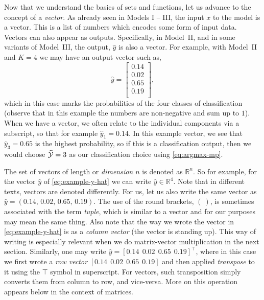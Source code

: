 Now that we understand the basics of sets and functions, let us advance to the concept of a {\em vector}. As already seen in Models I -- III, the input $x$ to the model is a vector. This is a list of numbers which encodes some form of input data. Vectors can also appear as outputs. Specifically, in Model~II, and in some variants of Model~III, the output, $\hat{y}$ is also a vector. For example, with Model~II and $K=4$ we may have an output vector such as,
%
\begin{equation}
\label{eq:example-y-hat}
\hat{y} =
\begin{bmatrix}
0.14 \\
0.02\\
0.65 \\
0.19\\
\end{bmatrix},
\end{equation}
%
which in this case marks the probabilities of the four classes of classification (observe that in this example the numbers are non-negative and sum up to $1$). When we have a vector, we often relate to the individual components via a subscript, so that for example $\hat{y}_1 = 0.14$. In this example vector, we see that $\hat{y}_3 = 0.65$ is the highest probability, so if this is a classification output, then we would choose $\widehat{\cal Y} = 3$ as our classification choice using \eqref{eq:argmax-mp}.

The set of vectors of length or {\em dimension $n$} is denoted as ${\mathbb R}^n$. So for example, for the vector $\hat{y}$ of \eqref{eq:example-y-hat} we can write $\hat{y} \in {\mathbb R}^4$. Note that in different texts, vectors are denoted differently. For us, let us also write the same vector as $\hat{y} = (0.14,\, 0.02,\, 0.65,\, 0.19)$. The use of the round brackets, $(~)$, is sometimes associated with the term {\em tuple}, which is similar to a vector and for our purposes may mean the same thing. Also note that the way we wrote the vector in \eqref{eq:example-y-hat} is as a {\em column vector} (the vector is standing up). This way of writing is especially relevant when we do matrix-vector multiplication in the next section. Similarly, one may write $\hat{y} = [ 0.14~~ 0.02~~0.65~~0.19]^\top$, where in this case we first wrote a {\em row vector} $[ 0.14~~ 0.02~~ 0.65~~ 0.19]$ and then applied {\em transpose} to it using the $\top$ symbol in superscript. For vectors, such transposition simply converts them from column to row, and vice-versa. More on this operation appears below in the context of matrices.

